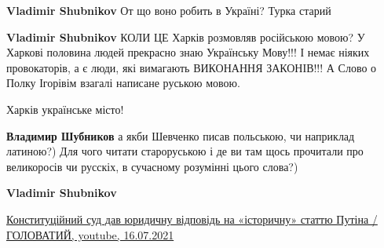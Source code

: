 \begin{itemize}
\begin{itemize}
 
\textbf{Vladimir Shubnikov} От що воно робить в Україні? Турка старий

 
\textbf{Vladimir Shubnikov} КОЛИ ЦЕ Харків розмовляв російською мовою? У
Харкові половина людей прекрасно знаю Українську Мову!!! І немає ніяких
провокаторів, а є люди, які вимагають ВИКОНАННЯ ЗАКОНІВ!!! А Слово о Полку
Ігорівім взагалі написане руською мовою.

 
Харків українське місто!

 
\textbf{Владимир Шубников} а якби Шевченко писав польською, чи наприклад
латиною?) Для чого читати староруською і де ви там щось прочитали про
великоросів чи русскіх, в сучасному розумінні цього слова?)

 
\textbf{Vladimir Shubnikov}

\href{https://www.youtube.com/watch?v=vvL0XGUc5qA}{%
Конституційний суд дав юридичну відповідь на «історичну» статтю Путіна / ГОЛОВАТИЙ, youtube, 16.07.2021%
%
}

 

\end{itemize}
\end{itemize}
